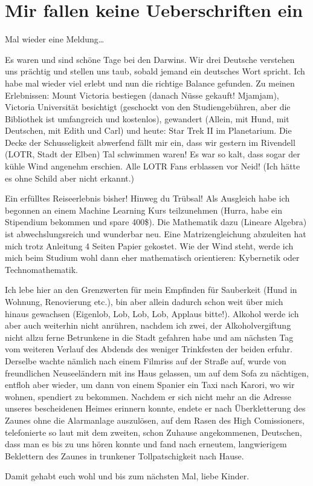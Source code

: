 \chapter{Mir fallen keine Ueberschriften ein}

Mal wieder eine Meldung\ldots{}

Es waren und sind schöne Tage bei den Darwins. Wir drei Deutsche
verstehen uns prächtig und stellen uns taub, sobald jemand ein deutsches
Wort spricht. Ich habe mal wieder viel erlebt und nun die richtige
Balance gefunden. Zu meinen Erlebnissen: Mount Victoria bestiegen
(danach Nüsse gekauft! Mjamjam), Victoria Universität besichtigt
(geschockt von den Studiengebühren, aber die Bibliothek ist umfangreich
und kostenlos), gewandert (Allein, mit Hund, mit Deutschen, mit Edith
und Carl) und heute: Star Trek II im Planetarium. Die Decke der
Schusseligkeit abwerfend fällt mir ein, dass wir gestern im Rivendell
(LOTR, Stadt der Elben) Tal schwimmen waren! Es war so kalt, dass sogar
der kühle Wind angenehm erschien. Alle LOTR Fans erblassen vor Neid!
(Ich hätte es ohne Schild aber nicht erkannt.)

Ein erfülltes Reiseerlebnis bisher! Hinweg du Trübsal! Als Ausgleich
habe ich begonnen an einem Machine Learning Kurs teilzunehmen (Hurra,
habe ein Stipendium bekommen und spare 400\$). Die Mathematik dazu
(Lineare Algebra) ist abwechslungsreich und wunderbar neu. Eine
Matrizengleichung abzuleiten hat mich trotz Anleitung 4 Seiten Papier
gekostet. Wie der Wind steht, werde ich mich beim Studium wohl dann eher
mathematisch orientieren: Kybernetik oder Technomathematik.

Ich lebe hier an den Grenzwerten für mein Empfinden für Sauberkeit (Hund
in Wohnung, Renovierung etc.), bin aber allein dadurch schon weit über
mich hinaus gewachsen (Eigenlob, Lob, Lob, Lob, Applaus bitte!). Alkohol
werde ich aber auch weiterhin nicht anrühren, nachdem ich zwei, der
Alkoholvergiftung nicht allzu ferne Betrunkene in die Stadt gefahren
habe und am nächsten Tag vom weiteren Verlauf des Abdends des weniger
Trinkfesten der beiden erfuhr. Derselbe wachte nämlich nach einem
Filmriss auf der Straße auf, wurde von freundlichen Neuseeländern mit
ins Haus gelassen, um auf dem Sofa zu nächtigen, entfloh aber wieder, um
dann von einem Spanier ein Taxi nach Karori, wo wir wohnen, spendiert zu
bekommen. Nachdem er sich nicht mehr an die Adresse unseres bescheidenen
Heimes erinnern konnte, endete er nach Überkletterung des Zaunes ohne
die Alarmanlage auszulösen, auf dem Rasen des High Comissioners,
telefonierte so laut mit dem zweiten, schon Zuhause angekommenen,
Deutschen, dass man es bis zu uns hören konnte und fand nach erneutem,
langwierigem Beklettern des Zaunes in trunkener Tollpatschigkeit nach
Hause.

Damit gehabt euch wohl und bis zum nächsten Mal, liebe Kinder.

